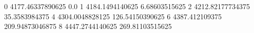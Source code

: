 0 4177.46337890625 0.0
1 4184.1494140625 6.68603515625
2 4212.82177734375 35.3583984375
4 4304.0048828125 126.54150390625
6 4387.412109375 209.94873046875
8 4447.2744140625 269.81103515625
